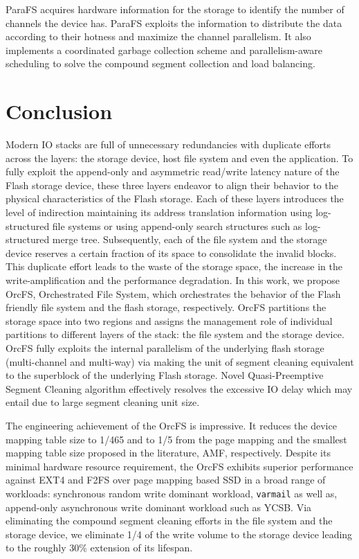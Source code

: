 \documentclass[prodmode,acmtecs]{acmsmall}
\begin{document}
ParaFS \cite{zhang2016parafs} acquires hardware information for the
storage to identify the number of channels the device has. ParaFS
exploits the information to distribute the data according to their
hotness and maximize the channel parallelism. It also implements
a coordinated garbage collection scheme and parallelism-aware scheduling
to solve the compound segment collection and load balancing.


\section{Conclusion}
\label{sec:conclusion}

Modern IO stacks are full of unnecessary redundancies with duplicate
efforts across the layers: the storage device, host file system and
even the application. To fully exploit the append-only and asymmetric
read/write latency nature of the Flash storage device, these three
layers endeavor to align their behavior to the physical
characteristics of the Flash storage. Each of these layers introduces
the level of indirection maintaining its address translation
information using log-structured file systems or using append-only
search structures such as log-structured merge tree. Subsequently, each
of the file system and the storage device reserves a certain fraction
of its space to consolidate the invalid blocks.  This duplicate
effort leads to the waste of the storage space, the increase in the
write-amplification and the performance degradation. In this work, we
propose OrcFS, Orchestrated File System, which orchestrates the
behavior of the Flash friendly file system and the flash storage,
respectively. OrcFS partitions the storage space into two regions and
assigns the management role of individual partitions to different
layers of the stack: the file system and the storage device. OrcFS fully
exploits the internal parallelism of the underlying flash storage
(multi-channel and multi-way) via making the unit of segment cleaning
equivalent to the superblock of the underlying Flash storage. Novel
Quasi-Preemptive Segment Cleaning algorithm effectively resolves the
excessive IO delay which may entail due to large segment cleaning unit
size.

The engineering achievement of the OrcFS is impressive.  It reduces the
device mapping table size to 1/465 and to 1/5 from the page mapping and
the smallest mapping table size proposed in the literature,
AMF, respectively.  Despite its minimal hardware resource
requirement, the OrcFS exhibits superior performance against EXT4 and
F2FS over page mapping based SSD in a broad range of workloads: 
synchronous random write dominant workload, \texttt{varmail} as well
as, append-only asynchronous write dominant workload such as YCSB.
Via eliminating the compound segment cleaning efforts in the
file system and the storage device, we eliminate 1/4 of the write
volume to the storage device leading to the roughly 30\% extension of
its lifespan.
\end{document}
